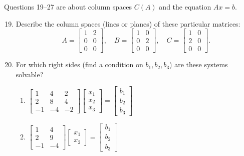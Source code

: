 \documentclass[14pt, a4paper]{article}
\begin{document}
\noindent Questions 19--27 are about column spaces $C(A)$ and the equation $Ax = b$.

\begin{enumerate}
    \setcounter{enumi}{18}
    \item Describe the column spaces (lines or planes) of these particular matrices:
          \[
              A = \begin{bmatrix}1&2\\0&0\\0&0\end{bmatrix},\quad
              B = \begin{bmatrix}1&0\\0&2\\0&0\end{bmatrix},\quad
              C = \begin{bmatrix}1&0\\2&0\\0&0\end{bmatrix}.
          \]

    \item For which right sides (find a condition on $b_1,b_2,b_3$) are these systems solvable?
          \begin{enumerate}
              \item $\begin{bmatrix}1&4&2\\2&8&4\\-1&-4&-2\end{bmatrix}\begin{bmatrix}x_1\\x_2\\x_3\end{bmatrix} = \begin{bmatrix}b_1\\b_2\\b_3\end{bmatrix}$
              \item $\begin{bmatrix}1&4\\2&9\\-1&-4\end{bmatrix}\begin{bmatrix}x_1\\x_2\end{bmatrix} = \begin{bmatrix}b_1\\b_2\\b_3\end{bmatrix}$
          \end{enumerate}


\end{enumerate}
\end{document}
